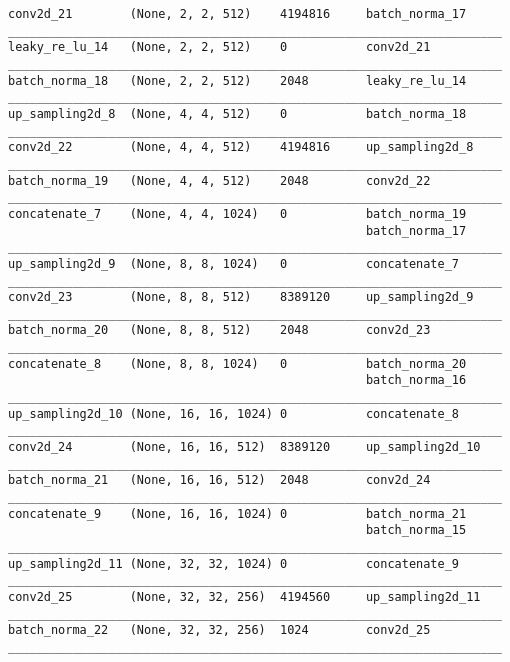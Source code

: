 \begin{verbatim}
conv2d_21        (None, 2, 2, 512)    4194816     batch_norma_17
_____________________________________________________________________
leaky_re_lu_14   (None, 2, 2, 512)    0           conv2d_21
_____________________________________________________________________
batch_norma_18   (None, 2, 2, 512)    2048        leaky_re_lu_14
_____________________________________________________________________
up_sampling2d_8  (None, 4, 4, 512)    0           batch_norma_18
_____________________________________________________________________
conv2d_22        (None, 4, 4, 512)    4194816     up_sampling2d_8
_____________________________________________________________________
batch_norma_19   (None, 4, 4, 512)    2048        conv2d_22
_____________________________________________________________________
concatenate_7    (None, 4, 4, 1024)   0           batch_norma_19
                                                  batch_norma_17
_____________________________________________________________________
up_sampling2d_9  (None, 8, 8, 1024)   0           concatenate_7
_____________________________________________________________________
conv2d_23        (None, 8, 8, 512)    8389120     up_sampling2d_9
_____________________________________________________________________
batch_norma_20   (None, 8, 8, 512)    2048        conv2d_23
_____________________________________________________________________
concatenate_8    (None, 8, 8, 1024)   0           batch_norma_20
                                                  batch_norma_16
_____________________________________________________________________
up_sampling2d_10 (None, 16, 16, 1024) 0           concatenate_8
_____________________________________________________________________
conv2d_24        (None, 16, 16, 512)  8389120     up_sampling2d_10
_____________________________________________________________________
batch_norma_21   (None, 16, 16, 512)  2048        conv2d_24
_____________________________________________________________________
concatenate_9    (None, 16, 16, 1024) 0           batch_norma_21
                                                  batch_norma_15
_____________________________________________________________________
up_sampling2d_11 (None, 32, 32, 1024) 0           concatenate_9
_____________________________________________________________________
conv2d_25        (None, 32, 32, 256)  4194560     up_sampling2d_11
_____________________________________________________________________
batch_norma_22   (None, 32, 32, 256)  1024        conv2d_25
_____________________________________________________________________

\end{verbatim}
